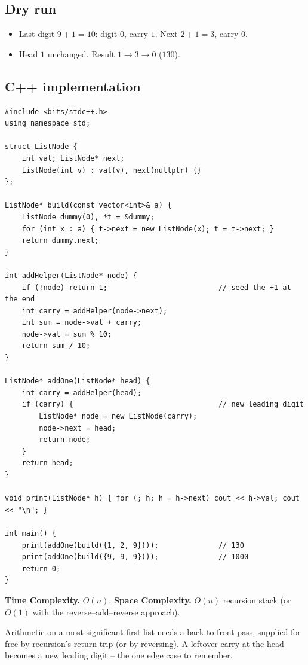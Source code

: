 \subsection*{Dry run}


\begin{itemize}
  \item Last digit $9+1=10$: digit $0$, carry $1$. Next $2+1=3$, carry $0$.
  \item Head $1$ unchanged. Result $1\to3\to0$ ($130$).
\end{itemize}

\subsection*{C++ implementation}

\begin{lstlisting}
#include <bits/stdc++.h>
using namespace std;

struct ListNode {
    int val; ListNode* next;
    ListNode(int v) : val(v), next(nullptr) {}
};

ListNode* build(const vector<int>& a) {
    ListNode dummy(0), *t = &dummy;
    for (int x : a) { t->next = new ListNode(x); t = t->next; }
    return dummy.next;
}

int addHelper(ListNode* node) {
    if (!node) return 1;                          // seed the +1 at the end
    int carry = addHelper(node->next);
    int sum = node->val + carry;
    node->val = sum % 10;
    return sum / 10;
}

ListNode* addOne(ListNode* head) {
    int carry = addHelper(head);
    if (carry) {                                  // new leading digit
        ListNode* node = new ListNode(carry);
        node->next = head;
        return node;
    }
    return head;
}

void print(ListNode* h) { for (; h; h = h->next) cout << h->val; cout << "\n"; }

int main() {
    print(addOne(build({1, 2, 9})));              // 130
    print(addOne(build({9, 9, 9})));              // 1000
    return 0;
}
\end{lstlisting}

\begin{complexitybox}
\textbf{Time Complexity.} $O(n)$. \textbf{Space Complexity.} $O(n)$
recursion stack (or $O(1)$ with the reverse--add--reverse approach).
\end{complexitybox}

\begin{takeawaybox}
Arithmetic on a most-significant-first list needs a back-to-front pass,
supplied for free by recursion's return trip (or by reversing). A leftover
carry at the head becomes a new leading digit -- the one edge case to
remember.
\end{takeawaybox}
